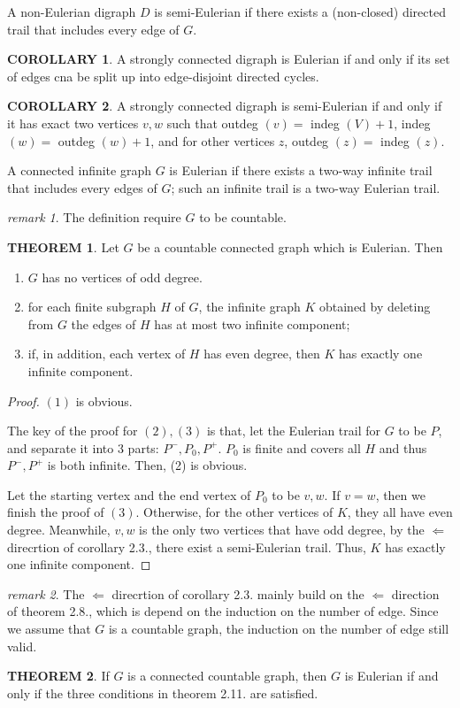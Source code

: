 \documentclass[a4paper,11pt]{article}%
\theoremstyle{remark}
\newtheorem*{remark}{remark}
\theoremstyle{definition}
\newtheorem{theorem}{THEOREM}[section]
\theoremstyle{definition}
\newtheorem{corollary}{COROLLARY}[section]
\theoremstyle{definition}
\theoremstyle{definition}
\theoremstyle{plain}
\theoremstyle{definition}
\begin{document}
A non-Eulerian digraph $D$ is semi-Eulerian if there exists a 
(non-closed) directed trail that includes every edge of $G$.
\begin{corollary}
    A strongly connected digraph is Eulerian if and only if its set of 
    edges cna be split up into edge-disjoint directed cycles.
\end{corollary}
\begin{corollary}
    A strongly connected digraph is semi-Eulerian if and only if it has exact
    two vertices $v,w$ such that outdeg $(v)=$ indeg $(V)+1$, indeg $(w)=$ outdeg $(w)+1$,
    and for other vertices $z$, outdeg $(z)=$ indeg $(z)$.
\end{corollary}
A connected infinite graph $G$ is Eulerian if there exists a two-way 
infinite trail that includes every edges of $G$; such an 
infinite trail is a two-way Eulerian trail.
\begin{remark}
    The definition require $G$ to be countable.
\end{remark}
\begin{theorem}
    Let $G$ be a countable connected graph which is Eulerian.
    Then
    \begin{enumerate}
        \item $G$ has no vertices of odd degree.
        \item for each finite subgraph $H$ of $G$, the infinite graph $K$
        obtained by deleting from $G$ the edges of $H$ has at most two infinite 
        component;
        \item if, in addition, each vertex of $H$ has even degree, then $K$
        has exactly one infinite component.
    \end{enumerate}
\end{theorem}
\begin{proof}
   $(1)$ is obvious.

    The key of the proof for $(2),(3)$ is that,
    let the Eulerian trail for $G$ to be $P$, and separate it into 
    3 parts: $P^-,P_0,P^+$. $P_0$ is finite and covers all $H$ and thus 
    $P^-,P^+$ is both infinite. Then, (2) is obvious.

    Let the starting vertex and the end vertex of $P_0$ to be $v,w$.
    If $v=w$, then we finish the proof of $(3)$. Otherwise, for the other 
    vertices of $K$, they all have even degree. Meanwhile, $v,w$ is the 
    only two vertices that have odd degree, by the $\Leftarrow$direcrtion of corollary 2.3., there exist a
    semi-Eulerian trail. Thus, $K$ has exactly one infinite component.
\end{proof}
\begin{remark}
   The $\Leftarrow$ direcrtion of corollary 2.3. mainly build on the $\Leftarrow$ direction of 
   theorem  2.8., which is depend on the induction on the number of edge.
   Since we assume that $G$ is a countable graph, the induction on 
   the number of edge still valid.
\end{remark}
\begin{theorem}
    If $G$ is a connected countable graph, then $G$ is Eulerian if and only if 
    the three conditions in theorem 2.11. are satisfied.
\end{theorem}
\end{document}
